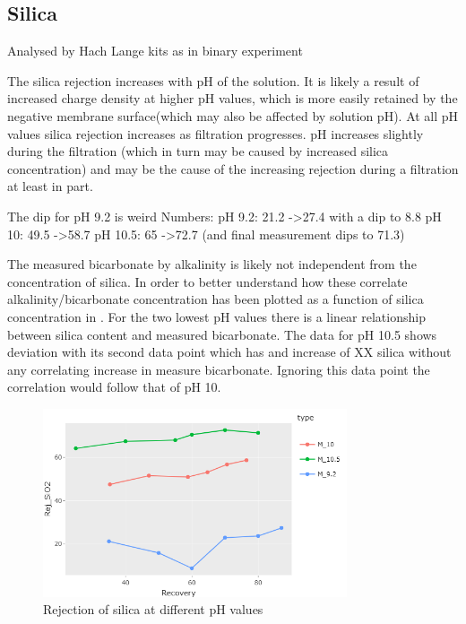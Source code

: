 \subsection{Silica}
Analysed by Hach Lange kits as in binary experiment 

The silica rejection increases with pH of the solution.
It is likely a result of increased charge density at higher pH values, which is more easily retained by the negative membrane surface(which may also be affected by solution pH).
At all pH values silica rejection increases as filtration progresses.
pH increases slightly during the filtration (which in turn may be caused by increased silica concentration) and may be the cause of the increasing rejection during a filtration at least in part. 

The dip for pH 9.2 is weird
Numbers:
pH 9.2: 21.2 ->27.4 with a dip to 8.8
pH 10: 49.5 ->58.7
pH 10.5: 65 ->72.7 (and final measurement dips to 71.3)

The measured bicarbonate by alkalinity is likely not independent from the concentration of silica.
In order to better understand how these correlate alkalinity/bicarbonate concentration has been plotted as a function of silica concentration in .
For the two lowest pH values there is a linear relationship between silica content and measured bicarbonate.
The data for pH 10.5 shows deviation with its second data point which has and increase of XX silica without any correlating increase in measure bicarbonate.
Ignoring this data point the correlation would follow that of pH 10.

\begin{figure}[H]
    \centering
    \includegraphics[width=0.8\textwidth]{Billeder/data/multi_salt/silica_rejection.png}
    \caption{Rejection of silica at different pH values}
    \label{fig:silica_rejection_multi_salt}
\end{figure}

